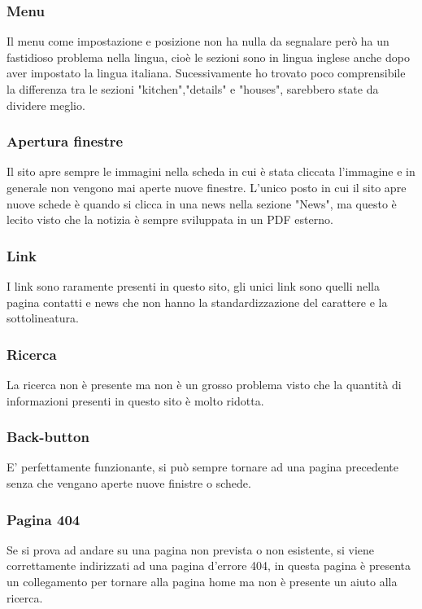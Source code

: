 \documentclass[../Relezione.tex]{subfiles}
\begin{document}
        \subsubsection{Menu}
            Il menu come impostazione e posizione non ha nulla da segnalare però ha un fastidioso problema nella lingua, cioè le sezioni sono in lingua inglese anche dopo aver impostato la lingua italiana.
            Sucessivamente ho trovato poco comprensibile la differenza tra le sezioni "kitchen","details" e "houses", sarebbero state da dividere meglio.

        
        \subsubsection{Apertura finestre}
            Il sito apre sempre le immagini nella scheda in cui è stata cliccata l'immagine e in generale non vengono mai aperte nuove finestre.
            L'unico posto in cui il sito apre nuove schede è quando si clicca in una news nella sezione "News", ma questo è lecito visto che la notizia è sempre sviluppata in un PDF esterno.
        
        \subsubsection{Link}
           I link sono raramente presenti in questo sito, gli unici link sono quelli nella pagina contatti e news che non hanno la standardizzazione del carattere e la sottolineatura.
        
        
        \subsubsection{Ricerca}
          La ricerca non è presente ma non è un grosso problema visto che la quantità di informazioni presenti in questo sito è molto ridotta.

        \subsubsection{Back-button}
            E' perfettamente funzionante, si può sempre tornare ad una pagina precedente senza che vengano aperte nuove finistre o schede. 
        \subsubsection{Pagina 404}
            Se si prova ad andare su una pagina non prevista o non esistente, si viene correttamente indirizzati ad una pagina d'errore 404, in questa pagina è presenta un collegamento per tornare alla pagina home ma non è presente un aiuto alla ricerca.
\end{document}
